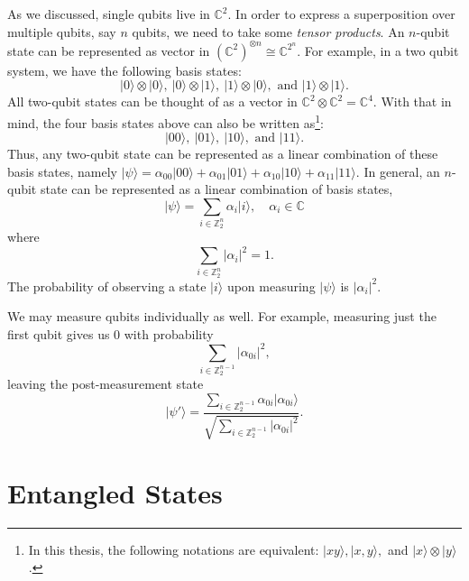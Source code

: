\documentclass[12pt,twoside]{reedthesis}
\theoremstyle{definition}
\newcommand{\Z}{\mathbb{Z}}
\newcommand{\C}{\mathbb{C}}
\newcommand{\ketz}{\ensuremath{\lvert 0\rangle}\xspace}
\newcommand{\keto}{\ensuremath{\lvert 1\rangle}\xspace}
\newcommand{\ket}[1]{\ensuremath{\lvert #1\rangle}\xspace}
\begin{document}
As we discussed, single qubits live in $\C^2$. In order to express a superposition over multiple qubits, say $n$ qubits, we need to take some \emph{tensor products}. An $n$-qubit state can be represented as vector in $(\C^2)^{\otimes n} \cong \C^{2^n}$. For example, in a two qubit system, we have the following basis states:
$$ \ketz \otimes \ketz,~\ketz \otimes \keto,~\keto \otimes \ketz, \text{ and } \keto \otimes \keto.$$ 
All two-qubit states can be thought of as a vector in $\C^2 \otimes \C^2 = \C^4$. With that in mind, the four basis states above can also be written as\footnote{In this thesis, the following notations are equivalent: $\ket{xy}, \ket{x, y},$ and $ \ket{x} \otimes \ket{y}$.}:
$$ \ket{00},~\ket{01},~\ket{10}, \text{ and } \ket{11}.$$
Thus, any two-qubit state can be represented as a linear combination of these basis states, namely $\ket{\psi} = \alpha_{00}\ket{00}+ \alpha_{01}\ket{01} + \alpha_{10}\ket{10} + \alpha_{11}\ket{11}.$ In general, an $n$-qubit state can be represented as a linear combination of basis states, 
\begin{equation*}
\ket{\psi} = \sum_{i \in \Z_2^n} \alpha_{i}\ket{i}, \quad \alpha_i \in \C
\end{equation*}
where
\begin{equation*}
\sum_{i \in \Z_2^n} \lvert \alpha_{i}\rvert^2 = 1.
\end{equation*}
The probability of observing a state \ket{i} upon measuring \ket{\psi} is $\lvert \alpha_{i} \rvert ^2.$ 

We may measure qubits individually as well. For example, measuring just the first qubit gives us 0 with probability 
\begin{equation*}
 \sum_{i \in \Z_2^{n-1}} \lvert \alpha_{0i} \rvert ^2,
\end{equation*}
leaving the post-measurement state
\begin{equation} \label{post_measurement}
 \ket{\psi'} = \frac{\sum_{i \in \Z_2^{n-1}} \alpha_{0i} \ket{\alpha_{0i}}}{\sqrt{\sum_{i \in \Z_2^{n-1}} \lvert \alpha_{0i} \rvert ^2}}.
\end{equation}

\section{Entangled States}
\end{document}

